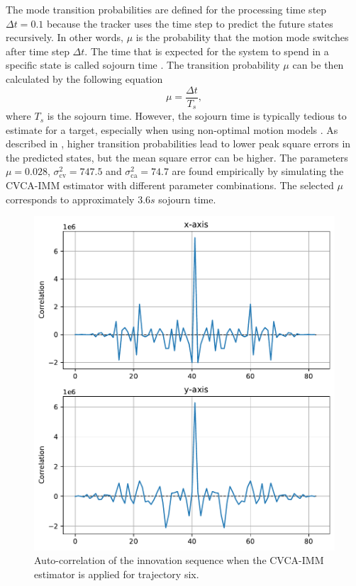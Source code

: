 \documentclass[english, 12pt, a4paper, elec, utf8, a-1b, online]{aaltothesis}
\newcommand{\varcv}{\sigma_\text{cv}^2}
\newcommand{\varca}{\sigma_\text{ca}^2}
\newcommand{\msp}{\mu}
\newcommand{\dt}{\Delta t}
\begin{document}
The mode transition probabilities are defined for the processing time step $\dt=0.1$ because the tracker uses the time step to predict the future states recursively.
In other words, $\msp$ is the probability that the motion mode switches after time step $\dt$.
The time that is expected for the system to spend in a specific state is called sojourn time \cite{Simeonova2002}.
The transition probability $\msp$ can be then calculated by the following equation
\begin{equation}
   \msp = \frac{\dt}{T_s},
\end{equation}
where $T_s$ is the sojourn time.
However, the sojourn time is typically tedious to estimate for a target, especially when using non-optimal motion models \cite{Simeonova2002}.
As described in \cite{Simeonova2002}, higher transition probabilities lead to lower peak square errors in the predicted states, but the mean square error can be higher.
The parameters $\msp=0.028$, $\varcv=747.5$ and $\varca=74.7$ are found empirically by simulating the CVCA-IMM estimator with different parameter combinations.
The selected $\msp$ corresponds to approximately $3.6s$ sojourn time.

\begin{figure}[bt]
    \centering
    \includegraphics[width=0.8\linewidth]{figures/benchmark/IMM/correlation_imm.pdf}
    \caption{Auto-correlation of the innovation sequence when the CVCA-IMM estimator is applied for trajectory six.}
    \label{fig:auto_correlation}
\end{figure}
\end{document}
